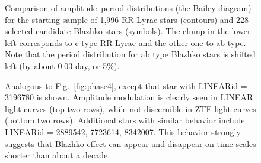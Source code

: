 \begin{figure}[ht]
  \centering
  \caption{Comparison of amplitude--period distributions (the Bailey
    diagram) for the starting sample of 1,996 RR Lyrae stars (contours)
      and 228 selected candidate Blazhko stars (symbols). The clump
      in the lower left corresponds to c type RR Lyrae and the
      other one to ab type. Note that the period distribution for ab
    type Blazhko stars is shifted left (by about 0.03 day, or 5\%).}
    \label{fig:AmplPeriod2D}
\end{figure}


\begin{figure}[ht]
  \centering
  \caption{Analogous to Fig.~\ref{fig:phase4}, except that star
  with LINEARid = 3196780 is shown. Amplitude modulation is clearly
  seen in LINEAR light curves (top two rows), while not discernible
  in ZTF light curves (bottom two rows). Additional stars with
  similar behavior include LINEARid = 2889542, 7723614, 8342007.
  This behavior strongly  suggests that Blazhko effect can appear and disappear on time scales shorter than
    about a decade.
    }
    \label{fig:phase6}
\end{figure}

